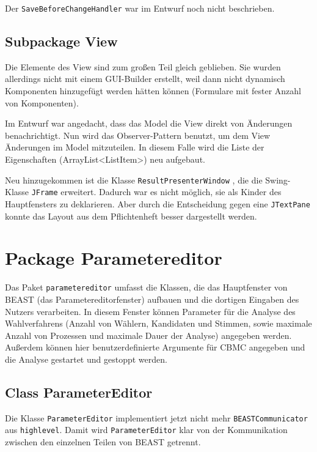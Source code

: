 \documentclass[a4paper]{scrreprt}
\begin{document}
Der \verb!SaveBeforeChangeHandler! war im Entwurf noch nicht beschrieben.

\subsection{Subpackage View}
Die Elemente des View sind zum großen Teil gleich geblieben. Sie wurden allerdings nicht mit einem GUI-Builder erstellt, weil dann nicht dynamisch Komponenten hinzugefügt werden hätten können (Formulare mit fester Anzahl von Komponenten).

Im Entwurf war angedacht, dass das Model die View direkt von Änderungen benachrichtigt. Nun wird das Observer-Pattern benutzt, um dem View Änderungen im Model mitzuteilen. In diesem Falle wird die Liste der Eigenschaften (ArrayList<ListItem>) neu aufgebaut.

Neu hinzugekommen ist die Klasse \verb!ResultPresenterWindow! , die die Swing-Klasse \verb!JFrame! erweitert. Dadurch war es nicht möglich, sie als Kinder des Hauptfensters zu deklarieren. Aber durch die Entscheidung gegen eine \verb!JTextPane! konnte das Layout aus dem Pflichtenheft besser dargestellt werden.

\section{Package Parametereditor}

Das Paket \verb!parametereditor! umfasst die Klassen, die das Hauptfenster von BEAST (das Parametereditorfenster) aufbauen und die dortigen Eingaben des Nutzers verarbeiten. In diesem Fenster können Parameter für die Analyse des Wahlverfahrens (Anzahl von Wählern, Kandidaten und Stimmen, sowie maximale Anzahl von Prozessen und maximale Dauer der Analyse) angegeben werden. Außerdem können hier benutzerdefinierte Argumente für CBMC angegeben und die Analyse gestartet und gestoppt werden.

\subsection{Class ParameterEditor}
Die Klasse \verb!ParameterEditor! implementiert jetzt nicht mehr \verb!BEASTCommunicator! aus \verb!highlevel!. Damit wird \verb!ParameterEditor! klar von der Kommunikation zwischen den einzelnen Teilen von BEAST getrennt. \\
\end{document}
